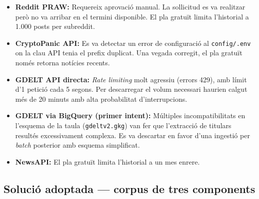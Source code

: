 \documentclass[12pt, a4paper]{report}
\begin{document}
\begin{itemize}
  \item \textbf{Reddit PRAW:} Requereix aprovació manual. La sol\textperiodcentered{}licitud es va realitzar però no va arribar en el termini disponible. El pla gratuït limita l'historial a 1.000 posts per subreddit.

  \item \textbf{CryptoPanic API:} Es va detectar un error de configuració al \texttt{config/.env} on la clau API tenia el prefix duplicat. Una vegada corregit, el pla gratuït només retorna notícies recents.

  \item \textbf{GDELT API directa:} \textit{Rate limiting} molt agressiu (errors 429), amb límit d'1 petició cada 5 segons. Per descarregar el volum necessari haurien calgut més de 20 minuts amb alta probabilitat d'interrupcions.

  \item \textbf{GDELT via BigQuery (primer intent):} Múltiples incompatibilitats en l'esquema de la taula (\texttt{gdeltv2.gkg}) van fer que l'extracció de titulars resultés excessivament complexa. Es va descartar en favor d'una ingestió per \textit{batch} posterior amb esquema simplificat.

  \item \textbf{NewsAPI:} El pla gratuït limita l'historial a un mes enrere.
\end{itemize}

\subsection{Solució adoptada --- corpus de tres components}
\end{document}
